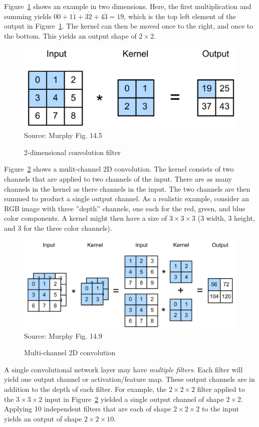 Figure~\ref{fig:screen2_chap16} shows an example in two dimensions. Here, the first multiplication and summing yields $0 \dot 0 + 1 \dot 1 + 3 \dot 2 + 4 \dot 3 = 19$, which is the top left element of the output in Figure~\ref{fig:screen2_chap16}. The kernel can then be moved once to the right, and once to the bottom. This yields an output shape of $2 \times 2$. 

\begin{figure}
\centering
\includegraphics[width=.5\textwidth]{screen2.png} \\

\scriptsize Source: Murphy Fig. 14.5
\caption{2-dimensional convolution filter}
\label{fig:screen2_chap16}
\end{figure}

Figure~\ref{fig:screen3} shows a mulit-channel 2D convolution. The kernel consists of two channels that are applied to two channels of the input. There are as many channels in the kernel as there channels in the input. The two channels are then summed to product a single output channel. As a realistic example, consider an RGB image with three ''depth'' channels, one each for the red, green, and blue color components. A kernel might then have a size of $3\times 3 \times 3$ (3 width, 3 height, and 3 for the three color channels).

\begin{figure}[b]
\centering
\includegraphics[width=.8\textwidth]{screen3.png} \\

\scriptsize Source: Murphy Fig. 14.9
\caption{Multi-channel 2D convolution}
\label{fig:screen3}
\end{figure}

A single convolutional network layer may have \emph{multiple filters}. Each filter will yield one output channel or activation/feature map. These output channels are in addition to the depth of each filter. For example, the $2 \times 2 \times 2$ filter applied to the $3 \times 3 \times 2$ input in Figure~\ref{fig:screen3} yielded a single output channel of shape $2 \times 2$. Applying 10 independent filters that are each of shape $2 \times 2 \times 2$ to the input yields an output of shape $2 \times 2 \times 10$.

